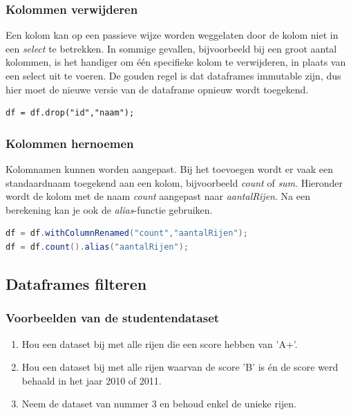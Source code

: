 \documentclass[a4paper,10pt,twoside]{report}
\begin{document}
\subsubsection{Kolommen verwijderen}

Een kolom kan op een passieve wijze worden weggelaten door de kolom niet in een \textit{select} te betrekken. In sommige gevallen, bijvoorbeeld bij een groot aantal kolommen, is het handiger om één specifieke kolom te verwijderen, in plaats van een select uit te voeren. De gouden regel is dat dataframes immutable zijn, dus hier moet de nieuwe versie van de dataframe opnieuw wordt toegekend.

\begin{lstlisting}
df = df.drop("id","naam");
\end{lstlisting}

\subsubsection{Kolommen hernoemen}

Kolomnamen kunnen worden aangepast. Bij het toevoegen wordt er vaak een standaardnaam toegekend aan een kolom, bijvoorbeeld \textit{count} of \textit{sum}. Hieronder wordt de kolom met de naam \textit{count} aangepast naar \textit{aantalRijen}. Na een berekening kan je ook de \textit{alias}-functie gebruiken. 

\begin{lstlisting}[language=Java]
df = df.withColumnRenamed("count","aantalRijen");
df = df.count().alias("aantalRijen");
\end{lstlisting}

\subsection{Dataframes filteren}

\subsubsection{Voorbeelden van de studentendataset}

\begin{enumerate}
	\item Hou een dataset bij met alle rijen die een score hebben van 'A+'.
	\item Hou een dataset bij met alle rijen waarvan de score 'B' is én de score werd behaald in het jaar 2010 of 2011.
	\item Neem de dataset van nummer 3 en behoud enkel de unieke rijen.
\end{enumerate}
\end{document}
